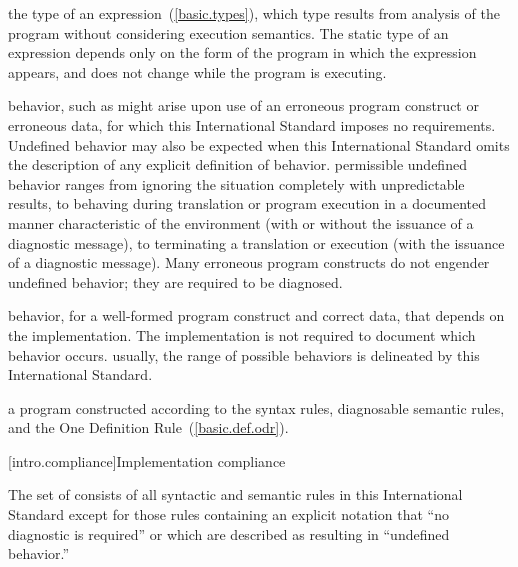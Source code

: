 %
the type of an expression~(\ref{basic.types}), which type results from
analysis of the program without considering execution semantics.
The static type of an expression depends only on the form of the program in
which the expression appears, and does not change while the program is
executing.

%
behavior, such as might arise upon use of an erroneous program construct
or erroneous data, for which this International Standard
imposes no requirements.
Undefined behavior may also be expected when
this International Standard omits the description of any explicit
definition of behavior.
\enternote permissible undefined behavior ranges
from ignoring the situation completely with unpredictable results, to
behaving during translation or program execution in a documented manner
characteristic of the environment (with or without the issuance of a
diagnostic message), to terminating a translation or execution (with the
issuance of a diagnostic message). Many erroneous program constructs do
not engender undefined behavior; they are required to be diagnosed.
\exitnote

%
behavior, for a well-formed program construct and correct data, that
depends on the implementation.
The implementation is not required to document which behavior occurs.
\enternote usually, the range of
possible behaviors is delineated by this International Standard.
\exitnote

%
a \Cpp program constructed according to the syntax rules, diagnosable
semantic rules, and the One Definition Rule~(\ref{basic.def.odr}).%

[intro.compliance]{Implementation compliance}

\pnum
{}%
%
The set of
consists of all syntactic and semantic rules in this International
Standard except for those rules containing an explicit notation that
``no diagnostic is required'' or which are described as resulting in
``undefined behavior.''

